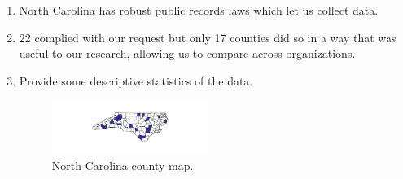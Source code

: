 \documentclass[fleqn]{MJDArticle}
\begin{document}
\begin{enumerate}
	\item North Carolina has robust public records laws which let us collect data.
	\item 22 complied with our request but only 17 counties did so in a way that  was  useful to our research, allowing us to compare across organizations.
	\item Provide some descriptive statistics of the data.
	\begin{figure}[H]
		\centering
	\caption{\label{fig:nc map} North Carolina county map.}	
	\centering
	\includegraphics[width = 0.48\textwidth]{images/County_Map.pdf}
	\end{figure}
	

\end{enumerate}
\end{document}
